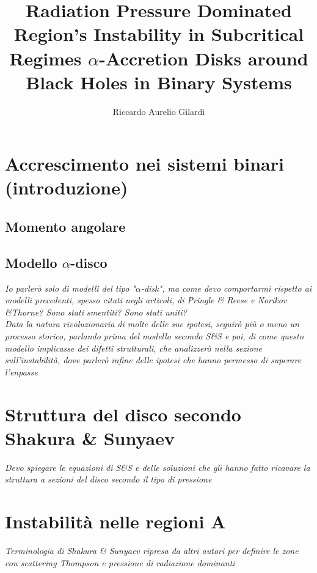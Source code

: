 \documentclass[a4paper]{article}
\newcommand{\subtitle}[1]{%
	\posttitle{%
		\par\end{center}
	\begin{center}\large#1\end{center}
	\vskip0.5em}%
}
\begin{document}
\title{Radiation Pressure Dominated Region's Instability in Subcritical Regimes $\alpha$-Accretion Disks around Black Holes in Binary Systems}
\subtitle{Appunti}
\author{Riccardo Aurelio Gilardi}
\maketitle

\tableofcontents
\newpage

\section{Accrescimento nei sistemi binari (introduzione)}
	\subsection{Momento angolare}
	\subsection{Modello $\alpha$-disco}
	
		\emph{Io parlerò solo di modelli del tipo "$\alpha$-disk", ma come devo comportarmi rispetto ai modelli precedenti, spesso citati negli articoli, di Pringle \& Reese e Norikov \&Thorne? Sono stati smentiti? Sono stati uniti?}\\
	
		\emph{Data la natura rivoluzionaria di molte delle sue ipotesi, seguirò più o meno un processo storico, parlando prima del modello secondo S\&S e poi, di come questo modello implicasse dei difetti strutturali, che analizzerò nella sezione sull'instabilità, dove parlerò infine delle ipotesi che hanno permesso di superare l'enpasse}

\section{Struttura del disco secondo Shakura \& Sunyaev}

	\emph{Devo spiegare le equazioni di S\&S e delle soluzioni che gli hanno fatto ricavare la struttura a sezioni del disco secondo il tipo di pressione}

\section{Instabilità nelle regioni A}

	\emph{Terminologia di Shakura \& Sunyaev ripresa da altri autori per definire le zone con scattering Thompson e pressione di radiazione dominanti}\\
	
\end{document}
